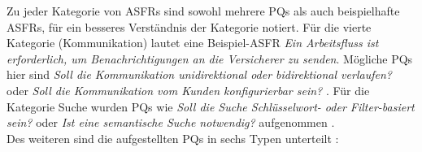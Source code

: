 Zu jeder Kategorie von ASFRs sind sowohl mehrere PQs als auch beispielhafte ASFRs, für ein besseres Verständnis der Kategorie notiert. Für die vierte Kategorie (Kommunikation) lautet eine Beispiel-ASFR \textit{Ein Arbeitsfluss ist erforderlich, um Benachrichtigungen an die Versicherer zu senden}. Mögliche PQs hier sind \textit{Soll die Kommunikation unidirektional oder bidirektional verlaufen?} oder \textit{Soll die Kommunikation vom Kunden konfigurierbar sein?} \cite{Ros03}. Für die Kategorie Suche wurden PQs wie \textit{Soll die Suche Schlüsselwort- oder Filter-basiert sein?} oder \textit{Ist eine semantische Suche notwendig?} aufgenommen \cite{Ros03}. \\

Des weiteren sind die aufgestellten PQs in sechs Typen unterteilt \cite{Ros02}: \\

